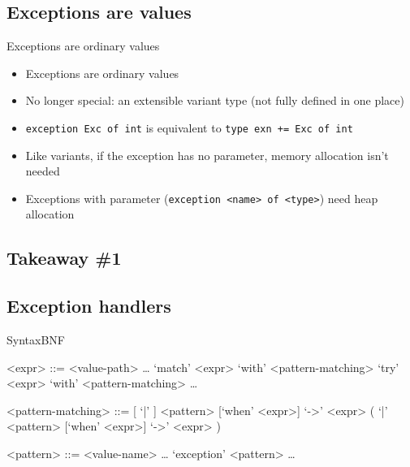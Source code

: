 %
%
\subsection{Exceptions are values}

\begin{frame}{Exceptions are ordinary values}
\begin{itemize}
\item Exceptions are ordinary values\footnotemark
\item No longer special: an extensible variant type (not fully defined in one place)
\item \texttt{exception Exc of int} is equivalent to \texttt{type exn += Exc of int}
\item Like variants, if the exception has no parameter, memory allocation isn't needed
\item Exceptions with parameter (\texttt{exception <name> of <type>}) need heap allocation
\end{itemize}
\end{frame}


%
%
\subsection*{Takeaway \#1}
\frameSubsectionTakeaway{}



%
%
\subsection{Exception handlers}

\begin{frame}[fragile]{Syntax}{BNF\footnotemark}
\begin{grammar}
<expr> ::= <value-path>
  \alt \dots
	\alt `match' <expr> `with' <pattern-matching>
	\alt `try' <expr> `with' <pattern-matching>
  \alt \dots

<pattern-matching> ::= [ `|' ] <pattern> [`when' <expr>] `->' <expr> ( `|' <pattern> [`when' <expr>] `->' <expr> )

<pattern> ::= <value-name>
	\alt \dots
	\alt `exception' <pattern>
	\alt \dots
\end{grammar}
\end{frame}


